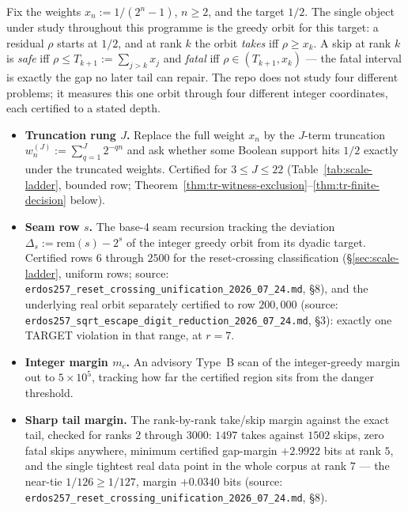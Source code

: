 Fix the weights $x_n:=1/(2^n-1)$, $n\ge2$, and the target $1/2$. The single object under study
throughout this programme is the greedy orbit for this target: a residual $\rho$ starts at $1/2$,
and at rank $k$ the orbit \emph{takes} iff $\rho\ge x_k$. A skip at rank $k$ is \emph{safe} iff
$\rho\le T_{k+1}:=\sum_{j>k}x_j$ and \emph{fatal} iff $\rho\in(T_{k+1},x_k)$ — the fatal interval is
exactly the gap no later tail can repair. The repo does not study four different problems; it
measures this one orbit through four different integer coordinates, each certified to a stated
depth.

\begin{itemize}
\item \textbf{Truncation rung $J$.} Replace the full weight $x_n$ by the $J$-term truncation
$w_n^{(J)}:=\sum_{q=1}^{J}2^{-qn}$ and ask whether some Boolean support hits $1/2$ exactly under
the truncated weights. Certified for $3\le J\le22$ (Table~\ref{tab:scale-ladder}, bounded row;
Theorem~\ref{thm:tr-witness-exclusion}--\ref{thm:tr-finite-decision} below).
\item \textbf{Seam row $s$.} The base-4 seam recursion tracking the deviation $\Delta_s:=\mathrm{rem}(s)-2^s$
of the integer greedy orbit from its dyadic target. Certified rows $6$ through $2500$ for the
reset-crossing classification (\S\ref{sec:scale-ladder}, uniform rows; source:
\texttt{erdos257\_reset\_crossing\_unification\_2026\_07\_24.md}, \S8), and the underlying real
orbit separately certified to row $200{,}000$ (source: \texttt{erdos257\_sqrt\_escape\_digit\_reduction\_2026\_07\_24.md},
\S3): exactly one TARGET violation in that range, at $r=7$.
\item \textbf{Integer margin $m_c$.} An advisory Type~B scan of the integer-greedy margin out to
$5\times10^5$, tracking how far the certified region sits from the danger threshold.
\item \textbf{Sharp tail margin.} The rank-by-rank take/skip margin against the exact tail, checked
for ranks $2$ through $3000$: $1497$ takes against $1502$ skips, zero fatal skips anywhere, minimum
certified gap-margin $+2.9922$ bits at rank $5$, and the single tightest real data point in the
whole corpus at rank $7$ — the near-tie $1/126\ge1/127$, margin $+0.0340$ bits (source:
\texttt{erdos257\_reset\_crossing\_unification\_2026\_07\_24.md}, \S8).
\end{itemize}

